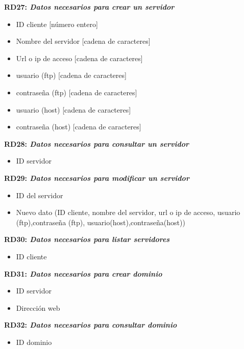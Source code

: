 \documentclass[paper=a4, fontsize=11pt, spanish]{scrartcl}
\begin{document}
\setlength{\parindent}{0em}
\textbf{RD27: \textit{Datos necesarios para crear un servidor}}
\setlength{\parindent}{2em}
\begin{itemize}
  \item ID cliente [número entero]
  \item Nombre del servidor [cadena de caracteres]
  \item Url o ip de acceso [cadena de caracteres]
  \item usuario (ftp) [cadena de caracteres]
  \item contraseña (ftp) [cadena de caracteres]
  \item usuario (host) [cadena de caracteres]
  \item contraseña (host) [cadena de caracteres]
\end{itemize}

\setlength{\parindent}{0em}
\textbf{RD28: \textit{Datos necesarios para consultar un servidor}}
\setlength{\parindent}{2em}
\begin{itemize}
  \item ID servidor
\end{itemize}

\setlength{\parindent}{0em}
\textbf{RD29: \textit{Datos necesarios para modificar un servidor}}
\setlength{\parindent}{2em}
\begin{itemize}
  \item ID del servidor
  \item Nuevo dato (ID cliente, nombre del servidor, url o ip de acceso, usuario (ftp),contraseña (ftp), usuario(host),contraseña(host))
\end{itemize}

\setlength{\parindent}{0em}
\textbf{RD30: \textit{Datos necesarios para listar servidores}}
\setlength{\parindent}{2em}
\begin{itemize}
  \item ID cliente
\end{itemize}

\setlength{\parindent}{0em}
\textbf{RD31: \textit{Datos necesarios para crear dominio}}
\setlength{\parindent}{2em}
\begin{itemize}
  \item ID servidor 
  \item Dirección web
\end{itemize}

\setlength{\parindent}{0em}
\textbf{RD32: \textit{Datos necesarios para consultar dominio}}
\setlength{\parindent}{2em}
\begin{itemize}
  \item ID dominio
\end{itemize}
\end{document}

